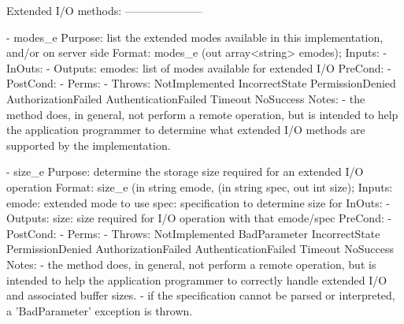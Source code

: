 \begin{myspec}
 
    Extended I/O methods:
    ---------------------
 
    - modes_e
      Purpose:  list the extended modes available in this
                implementation, and/or on server side
      Format:   modes_e            (out array<string> emodes);
      Inputs:   -
      InOuts:   -
      Outputs:  emodes:             list of modes available for
                                    extended I/O
      PreCond:  -
      PostCond: -
      Perms:    - 
      Throws:   NotImplemented
                IncorrectState
                PermissionDenied
                AuthorizationFailed
                AuthenticationFailed
                Timeout
                NoSuccess
      Notes:    - the method does, in general, not perform a
                  remote operation, but is intended to help
                  the application programmer to determine what
                  extended I/O methods are supported by the
                  implementation.
 
 
    - size_e
      Purpose:  determine the storage size required for an
                extended I/O operation
      Format:   size_e             (in  string  emode,
                                   (in  string  spec,
                                    out int     size);
      Inputs:   emode:              extended mode to use
                spec:               specification to determine
                                    size for
      InOuts:   -
      Outputs:  size:               size required for I/O
                                    operation with that 
                                    emode/spec
      PreCond:  -
      PostCond: -
      Perms:    - 
      Throws:   NotImplemented
                BadParameter
                IncorrectState
                PermissionDenied
                AuthorizationFailed
                AuthenticationFailed
                Timeout
                NoSuccess
      Notes:    - the method does, in general, not perform a
                  remote operation, but is intended to help
                  the application programmer to correctly handle 
                  extended I/O and associated buffer sizes.
                - if the specification cannot be parsed or 
                  interpreted, a 'BadParameter' exception is 
                  thrown.
 

\end{myspec}
